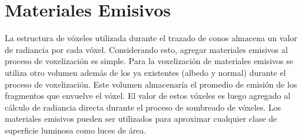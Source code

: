 \section{Materiales Emisivos} %
\label{sec:materiales_emisivos}
La estructura de vóxeles utilizada durante el trazado de conos almacena un valor de radiancia por cada vóxel. Considerando esto, agregar materiales emisivos al proceso de voxelización es simple. Para la voxelización de materiales emisivos se utiliza otro volumen además de los ya existentes (albedo y normal) durante el proceso de voxelización. Este volumen almacenaría el promedio de emisión de los fragmentos que envuelve el vóxel. El valor de estos vóxeles es luego agregado al cálculo de radiancia directa durante el proceso de sombreado de vóxeles. Los materiales emisivos pueden ser utilizados para aproximar cualquier clase de superficie luminosa como luces de área.
